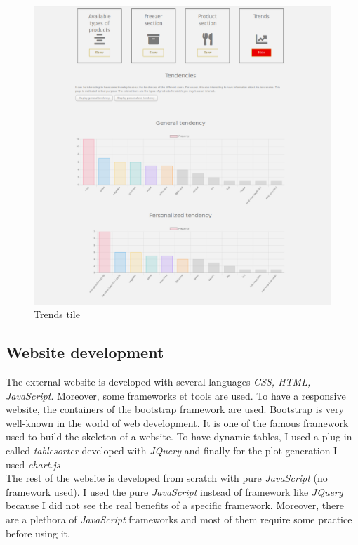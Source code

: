 \begin{figure}[H]
\centering
\includegraphics[scale=0.3]{./images/dashboard_trends.png}
\caption{Trends tile}
\label{fig:dashboard_trends}
\end{figure}

\subsection{Website development}
The external website is developed with several languages \textit{CSS, HTML, JavaScript}. Moreover, some frameworks et tools are used. To have a responsive website, the containers of the bootstrap framework are used. Bootstrap is very well-known in the world of web development. It is one of the famous framework used to build the skeleton of a website. To have dynamic tables, I used a plug-in called \textit{tablesorter} developed with \textit{JQuery} and finally for the plot generation I used \textit{chart.js} \\

The rest of the website is developed from scratch with pure \textit{JavaScript} (no framework used). I used the pure \textit{JavaScript} instead of framework like \textit{JQuery} because I did not see the real benefits of a specific framework. Moreover, there are a plethora of \textit{JavaScript} frameworks and most of them require some practice before using it.\\

